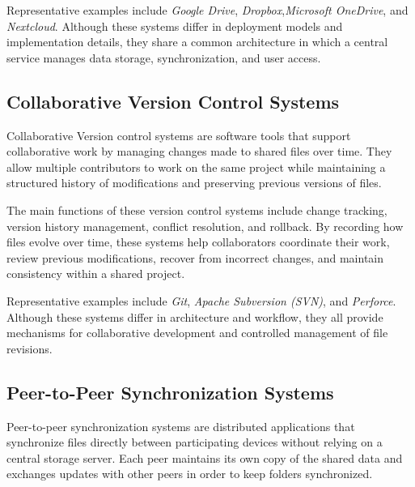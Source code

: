 Representative examples include \textit{Google Drive}, \textit{Dropbox},\textit {Microsoft OneDrive}, and \textit{Nextcloud}.
Although these systems differ in deployment models and implementation details, they share a common architecture in which a central service manages data storage, synchronization, and user access.

\subsection{Collaborative Version Control Systems}

%
%

Collaborative Version control systems are software tools that support collaborative work by managing changes made to shared files over time. 
They allow multiple contributors to work on the same project while maintaining a structured history of modifications and preserving previous versions of files.

The main functions of these version control systems include change tracking, version history management, conflict resolution, and rollback.
By recording how files evolve over time, these systems help collaborators coordinate their work, review previous modifications, recover from incorrect changes, and maintain consistency within a shared project.

Representative examples include \textit{Git}, \textit{Apache Subversion (SVN)}, and \textit{Perforce}.
Although these systems differ in architecture and workflow, they all provide mechanisms for collaborative development and controlled management of file revisions.

\subsection{Peer-to-Peer Synchronization Systems}

%
%


Peer-to-peer synchronization systems are distributed applications that synchronize files directly between participating devices without relying on a central storage server.
Each peer maintains its own copy of the shared data and exchanges updates with other peers in order to keep folders synchronized.


